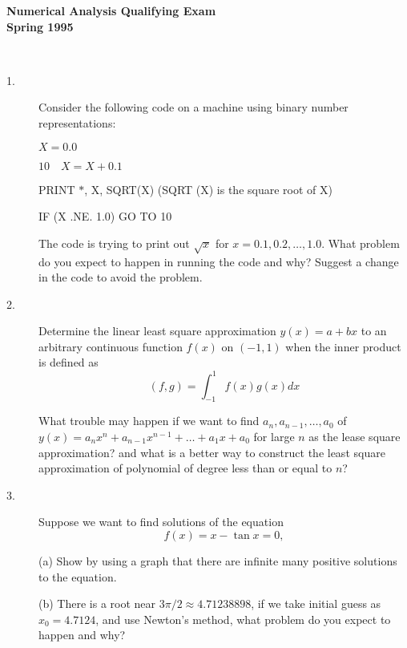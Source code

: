 \documentclass{article}
\begin{document}






\begin{center}\begin{LARGE}
{\bf Numerical Analysis Qualifying Exam}\\ 
{\bf Spring 1995}\\ \end{LARGE}
\end{center}
\vspace{0.1in}
\noindent\hrulefill\\
\begin{description}

\item[1.]
Consider the following code on a machine using binary number representations:

$X = 0.0$

$10  \quad X=X+0.1$

PRINT $\ast$, X, SQRT(X) \quad (SQRT (X) is the square root of X)

IF (X .NE. 1.0) GO TO 10

The code is trying to print out $\sqrt{x}$ for $x=0.1, 0.2, \dots, 1.0$.
What problem do you expect to happen in running the code and why? Suggest
a change in the code to avoid the problem.

\item[2.]
Determine the linear least square approximation $y(x)=a+bx$ to an arbitrary
continuous function $f(x)$ on $(-1,1)$ when the inner product is defined as
$$(f,g) = \int^1_{-1} f(x)g(x) dx$$

What trouble may happen if we want to find $a_n, a_{n-1}, \dots, a_0$
of $y(x) = a_n x^n + a_{n-1} x^{n-1} + \dots + a_1 x+a_0$ for large $n$ as
the lease square approximation? and what is a better way to construct
the least square approximation of polynomial of degree less than or equal to
$n$?

\item[3.]
Suppose we want to find solutions of the equation
$$f(x) = x - \tan x=0,$$

\item[\quad] (a)
Show by using a graph that there are infinite many positive solutions to
the equation.

\item[\quad] (b)
There is a root near $3\pi /2 \approx 4.71238898$, if we take initial guess
as $x_0 = 4.7124$, and use Newton's method, what problem do you expect to
happen and why?


\end{description}
\end{document}
